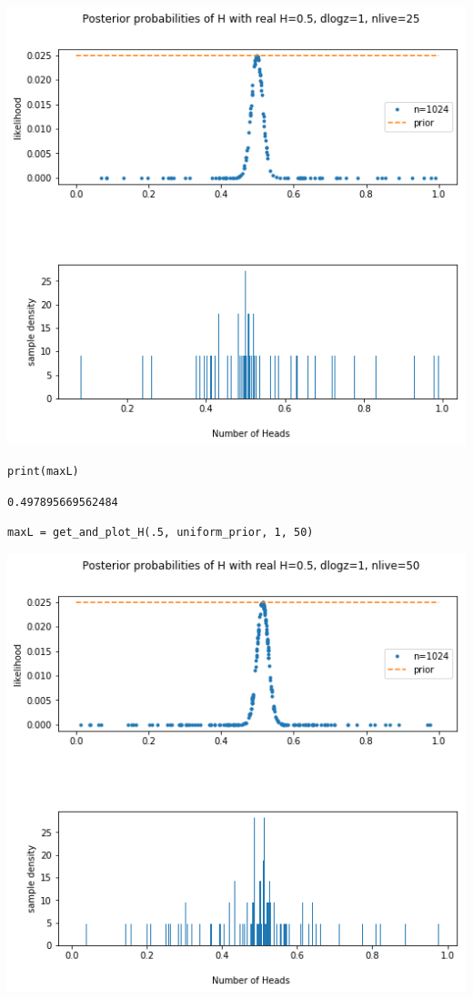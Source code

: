 \documentclass[11pt]{article}
\begin{document}
\begin{itemize}
\includegraphics[width=.9\linewidth]{./obipy-resources/692SGC.png}

\begin{verbatim}
print(maxL)
\end{verbatim}

\begin{verbatim}
0.497895669562484
\end{verbatim}

\begin{verbatim}
maxL = get_and_plot_H(.5, uniform_prior, 1, 50)
\end{verbatim}

\includegraphics[width=.9\linewidth]{./obipy-resources/692fQI.png}


\end{itemize}
\end{document}
